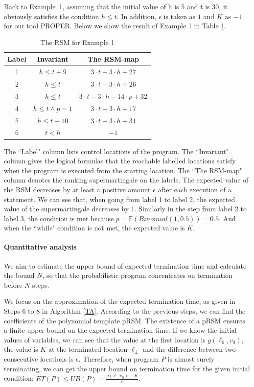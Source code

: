 \documentclass[conference]{IEEEtran}
\begin{document}
Back to Example~1, assuming that the initial value of h is 5 and t is 30, it obviously satisfies the condition $h \leq t$. In addition, $\epsilon$ is taken as $1$ and $K$ as $-1$ for our tool PROPER. Below we show the result of Example 1 in Table \ref{RSM}.

\begin{table}[htb]
	\centering
	\caption{The RSM for Example 1}
	\label{RSM}
	\begin{tabular}{|c|c|c|}
		\hline
		Label& Invariant & The RSM-map  \\ \hline
		1 & $h\leq t+9$ &$3\cdot t-3\cdot h+27$ \\ \hline
		2 & $h\leq t$ &$3\cdot t-3\cdot h+26$ \\ \hline
		3 & $h\leq t$  &$3\cdot t-3\cdot h-14\cdot p+32$ \\ \hline
		4 & $h\leq t\land p=1$ &$3\cdot t-3\cdot h+17$ \\ \hline
		5 & $h\leq t+10$&$3\cdot t-3\cdot h+31$ \\ \hline
		6 & $t<h$ &$-1$ \\ \hline
	\end{tabular}
\end{table}

The ``Label" column lists control locations of the program. The ``Invariant" column gives the logical formulas that the reachable labelled locations satisfy when the program is executed from the starting location. The ``The RSM-map" column denotes the ranking supermartingale on the labels. The expected value of the RSM decreases by at least a positive amount $\epsilon$ after each execution of a statement. We can see that, when going from label 1 to label 2, the expected value of the supermartingale decreases by 1. Similarly  in the step from label 2 to label 3,  the condition is met because $p=\mathbb{E}(Binomial(1,0.5))=0.5$. And when the ``while" condition is not met, the expected value is $K$.

\paragraph{Quantitative analysis} We aim to estimate the upper bound of expected termination time and calculate the bound $N$, so that the probabilistic program concentrates on termination before $N$ steps. 

We focus on the approximation of the expected termination time, as given in Steps 6 to 8 in Algorithm \ref{TA}. According to the previous steps, we can find the coefficients of the polynomial template pRSM. The existence of a pRSM ensures a finite upper bound on the expected termination time. If we know the initial values of variables, we can see that the value at the first location is $g(\ell_0, v_0)$, the value is $K$ at the terminated location $\ell_\bot$ and the difference between two consecutive locations is $\epsilon$.  Therefore, when program $P$ is almost surely terminating, we can get the upper bound on termination time for the given initial condition: $ET(P) \leq UB(P) = \frac{g(\ell, v_0)-K}{\epsilon}$. 
\end{document}
